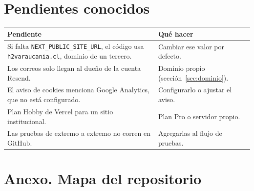 \documentclass[11pt,letterpaper]{article}
\newcommand{\var}[1]{\nolinkurl{#1}}
\newcommand{\cab}[1]{\textbf{\color{h2vgris}#1}}
\begin{document}
\section{Pendientes conocidos}

\begin{tabularx}{\textwidth}{@{}YP{6.1cm}@{}}
\toprule
\cab{Pendiente} & \cab{Qué hacer}\\
\midrule
Si falta \var{NEXT_PUBLIC_SITE_URL}, el código usa \var{h2varaucania.cl}, dominio de un tercero. & Cambiar ese valor por defecto.\\
Los correos solo llegan al dueño de la cuenta Resend. & Dominio propio (sección~\ref{sec:dominio}).\\
El aviso de cookies menciona Google Analytics, que no está configurado. & Configurarlo o ajustar el aviso.\\
Plan Hobby de Vercel para un sitio institucional. & Plan Pro o servidor propio.\\
Las pruebas de extremo a extremo no corren en GitHub. & Agregarlas al flujo de pruebas.\\
\bottomrule
\end{tabularx}

\section*{Anexo. Mapa del repositorio}
\end{document}
